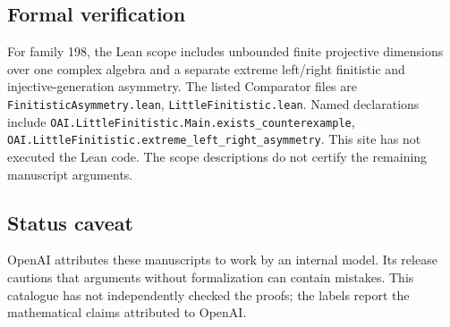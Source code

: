 \documentclass[11pt]{article}
\begin{document}
\subsection{Formal verification}
For family 198, the Lean scope includes unbounded finite projective dimensions over one complex algebra and a separate extreme left/right finitistic and injective-generation asymmetry. The listed Comparator files are \texttt{FinitisticAsymmetry.lean}, \texttt{LittleFinitistic.lean}. Named declarations include \texttt{OAI.LittleFinitistic.Main.exists\_counterexample}, \texttt{OAI.LittleFinitistic.extreme\_left\_right\_asymmetry}. This site has not executed the Lean code. The scope descriptions do not certify the remaining manuscript arguments.

\subsection{Status caveat}
OpenAI attributes these manuscripts to work by an internal model. Its release cautions that arguments without formalization can contain mistakes. This catalogue has not independently checked the proofs; the labels report the mathematical claims attributed to OpenAI.
\end{document}
